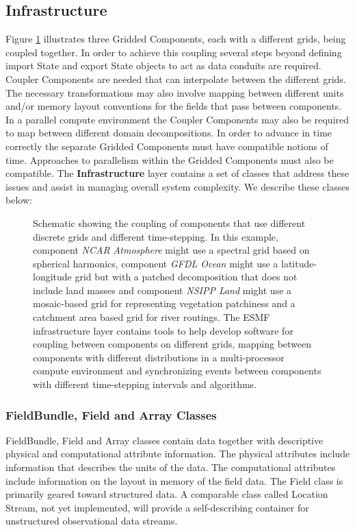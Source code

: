 \subsection{Infrastructure}
\label{sec:infrastructure}
Figure \ref{fig:threecomponents} illustrates three Gridded Components, each with a different grids, being coupled together. In 
order to achieve this coupling several steps beyond defining import State and 
export State objects to act
as data conduits are required. Coupler Components are needed that can interpolate between the different
grids.  The necessary transformations may also involve mapping between different units and/or memory layout conventions for the fields that
pass between components. In a parallel compute environment the Coupler Components may also be required to map between different 
domain decompositions. In order to advance in time correctly the separate Gridded Components must have compatible notions
of time. Approaches to parallelism within the Gridded Components must also be compatible. The {\bf Infrastructure} layer
contains a set of classes that address these issues and assist in managing overall system complexity. We describe
these classes below:

\begin{figure}
\caption{Schematic showing the coupling of components that use different discrete grids and different time-stepping. 
In this example, component {\it NCAR Atmosphere} might use a spectral grid based on spherical harmonics, component
{\it GFDL Ocean} might use a latitude-longitude grid but with a patched decomposition that does not include
land masses and component {\it NSIPP Land} might use a mosaic-based grid for representing vegetation patchiness
and a catchment area based grid for river routings. The ESMF infrastructure layer contains tools to help develop 
software for coupling between components on different grids, mapping between components with different distributions in a 
multi-processor compute environment and synchronizing events between components with different time-stepping intervals 
and algorithms.  }
\label{fig:threecomponents}
\end{figure}

\subsubsection{FieldBundle, Field and Array Classes}
FieldBundle, Field and Array classes contain data together with descriptive
physical and computational attribute information. The physical attributes include information that describes the units
of the data. The computational attributes include information on the layout in memory of the field data. The Field class
is primarily geared toward structured data. A comparable class called Location Stream, not yet implemented, will provide a self-describing
container for unstructured observational data streams.

